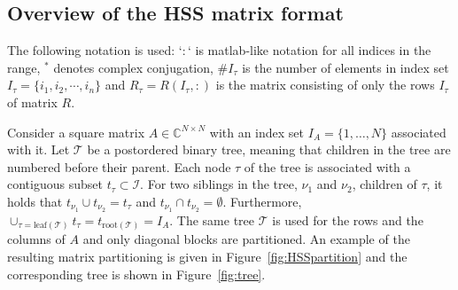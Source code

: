 \documentclass{article}
\begin{document}
\subsection{Overview of the HSS matrix format}\label{sec:HSSformat}
The following notation is used: `$:$` is matlab-like notation for all
indices in the range, $^*$ denotes complex conjugation, $\#I_\tau$ is
the number of elements in index set $I_{\tau} = \{ i_1, i_2, \cdots,
i_n\}$ and $R_\tau = R(I_\tau,:)$ is the matrix consisting of only the
rows $I_\tau$ of matrix $R$.

Consider a square matrix $A \in \mathbb{C}^{N \times N}$ with an index
set $I_{A} = \{1,\dots,N \}$ associated with it. Let $\mathcal{T}$ be
a postordered binary tree, meaning that children in the tree are
numbered before their parent. Each node $\tau$ of the tree is
associated with a contiguous subset $t_\tau \subset \mathcal{I}$. For
two siblings in the tree, $\nu_1$ and $\nu_2$, children of $\tau$, it
holds that $t_{\nu_1} \cup t_{\nu_2} = t_\tau$ and $t_{\nu_1} \cap
t_{\nu_2} = \emptyset$. Furthermore,
$\cup_{\tau=\textrm{leaf}(\mathcal{T})} t_\tau =
t_{\textrm{root}(\mathcal{T})} = I_A$. The same tree $\mathcal{T}$ is
used for the rows and the columns of $A$ and only diagonal blocks are
partitioned. An example of the resulting matrix partitioning is given
in Figure~\ref{fig:HSSpartition} and the corresponding tree is shown
in Figure~\ref{fig:tree}.
\end{document}
